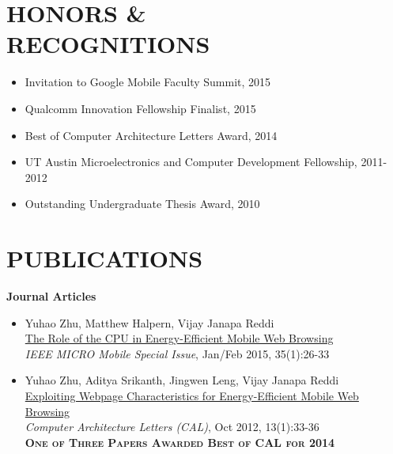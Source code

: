 \documentclass[margin, 9pt]{res} %
\begin{document}
\begin{resume}
 
\section{HONORS \&\\ RECOGNITIONS}

\begin{itemize}[leftmargin=*] \itemsep -4pt
	\item Invitation to Google Mobile Faculty Summit, 2015
	\item Qualcomm Innovation Fellowship Finalist, 2015
	\item Best of Computer Architecture Letters Award, 2014
	\item UT Austin Microelectronics and Computer Development Fellowship, 2011-2012
	\item Outstanding Undergraduate Thesis Award, 2010
\end{itemize}

 
\section{PUBLICATIONS}

{\large\textbf{Journal Articles}}

\begin{itemize}[leftmargin=*] \itemsep 0pt
	\item Yuhao Zhu, Matthew Halpern, Vijay Janapa Reddi\\
          \href{http://yuhaozhu.com/pubs/ieeemicro15.pdf}{The Role of the CPU in Energy-Efficient Mobile Web Browsing}\\
          \textit{IEEE MICRO Mobile Special Issue}, Jan/Feb 2015, 35(1):26-33

	\item Yuhao Zhu, Aditya Srikanth, Jingwen Leng, Vijay Janapa Reddi\\
          \href{http://yuhaozhu.com/pubs/cal12.pdf}{Exploiting Webpage Characteristics for Energy-Efficient Mobile Web Browsing}\\
          \textit{Computer Architecture Letters (CAL)}, Oct 2012, 13(1):33-36\\
          \textbf{\textsc{One of Three Papers Awarded Best of CAL for 2014}}


\end{itemize}
\end{resume}
\end{document}
